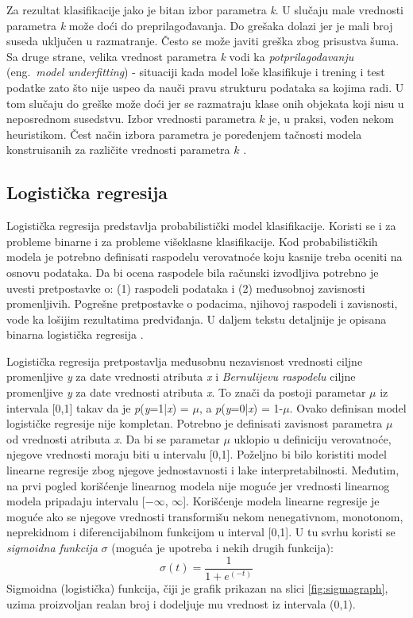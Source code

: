 \documentclass[12pt,oneside]{memoir}
\begin{document}
Za rezultat klasifikacije jako je bitan izbor parametra \textit{k}. U slučaju male vrednosti parametra \textit{k} može doći do preprilagođavanja. Do grešaka dolazi jer je mali broj suseda uključen u razmatranje. Često se može javiti greška zbog prisustva šuma. Sa druge strane, velika vrednost parametra \textit{k} vodi ka \textit{potprilagođavanju} (eng.~\textit{model underfitting}) - situaciji kada model loše klasifikuje i trening i test podatke zato što nije uspeo da nauči pravu strukturu podataka sa kojima radi. U tom slučaju do greške može doći jer se razmatraju klase onih objekata koji nisu u neposrednom susedstvu. Izbor vrednosti parametra $k$ je, u praksi, vođen nekom heuristikom. Čest način izbora parametra je poređenjem tačnosti modela konstruisanih za različite vrednosti parametra $k$ \cite{mladen, mitic, aggarwal}.

\subsection{Logistička regresija}
\label{sec:logreg}

Logistička regresija predstavlja probabilistički model klasifikacije. Koristi se i za probleme binarne i za probleme višeklasne klasifikacije. Kod probabilističkih modela je potrebno definisati raspodelu verovatnoće koju kasnije treba oceniti na osnovu podataka. Da bi ocena raspodele bila računski izvodljiva potrebno je uvesti pretpostavke o: (1) raspodeli podataka i (2) međusobnoj zavisnosti promenljivih. Pogrešne pretpostavke o podacima, njihovoj raspodeli i zavisnosti, vode ka lošijim rezultatima predviđanja. U daljem tekstu detaljnije je opisana binarna logistička regresija \cite{mladen}.

Logistička regresija pretpostavlja međusobnu nezavisnost vrednosti ciljne promenljive \textit{y} za date vrednosti atributa \textit{x} i \textit{Bernulijevu raspodelu} ciljne promenljive \textit{y} za date vrednosti atributa \textit{x}. To znači da postoji parametar  $\mu$ iz intervala [0,1] takav da je  \textit{p}(\textit{y}=1|\textit{x}) = $\mu$, a  \textit{p}(\textit{y}=0|\textit{x}) = 1-$\mu$. Ovako definisan model logističke regresije nije kompletan. Potrebno je definisati zavisnost parametra $\mu$ od vrednosti atributa \textit{x}. Da bi se parametar $\mu$ uklopio u definiciju verovatnoće, njegove vrednosti moraju biti u intervalu [0,1]. Poželjno bi bilo koristiti model linearne regresije zbog njegove jednostavnosti i lake interpretabilnosti. Međutim, na prvi pogled korišćenje linearnog modela nije moguće jer vrednosti linearnog modela pripadaju intervalu [$-\infty$, $\infty$]. Korišćenje modela linearne regresije je moguće ako se njegove vrednosti transformišu nekom nenegativnom, monotonom, neprekidnom i diferencijabilnom funkcijom u interval [0,1]. U tu svrhu koristi se \textit{sigmoidna funkcija} $\sigma$ (moguća je upotreba i nekih drugih funkcija):
$$ \sigma(t) = \frac{\mathrm{1}}{\mathrm{1} + e^{(- t)}} $$
Sigmoidna (logistička) funkcija, čiji je grafik prikazan na slici \ref{fig:sigmagraph}, uzima proizvoljan realan broj i dodeljuje mu vrednost iz intervala (0,1). 
\end{document}
